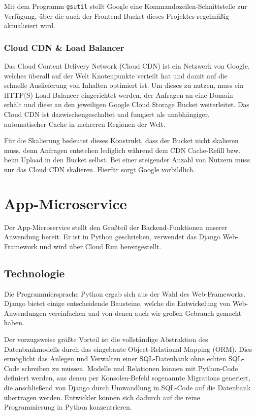 \documentclass{article}
\begin{document}
Mit dem Programm \texttt{gsutil} stellt Google eine Kommandozeilen-Schnittstelle zur Verfügung, über die auch der Frontend Bucket dieses Projektes regelmäßig aktualisiert wird.


\subsubsection{Cloud CDN \& Load Balancer}

Das Cloud Content Delivery Network (Cloud CDN) ist ein Netzwerk von Google, welches überall auf der Welt Knotenpunkte verteilt hat und damit auf die schnelle Auslieferung von Inhalten optimiert ist. Um dieses zu nutzen, muss ein HTTP(S) Load Balancer eingerichtet werden, der Anfragen an eine Domain erhält und diese an den jeweiligen Google Cloud Storage Bucket weiterleitet. Das Cloud CDN ist dazwischengeschaltet und fungiert als unabhängiger, automatischer Cache in mehreren Regionen der Welt.

Für die Skalierung bedeutet dieses Konstrukt, dass der Bucket nicht skalieren muss, denn Anfragen entstehen lediglich während dem CDN Cache-Refill bzw. beim Upload in den Bucket selbst. Bei einer steigender Anzahl von Nutzern muss nur das Cloud CDN skalieren. Hierfür sorgt Google vorbildlich.


\section{App-Microservice} %
\label{sec:app-microservice}

Der App-Microservice stellt den Großteil der Backend-Funktionen unserer Anwendung bereit. Er ist in Python geschrieben, verwendet das Django Web-Framework und wird über Cloud Run bereitgestellt.


\subsection{Technologie}
\label{sec:app-tech}

Die Programmiersprache Python ergab sich aus der Wahl des Web-Frameworks. Django bietet einige entscheidende Bausteine, welche die Entwickelung von Web-Anwendungen vereinfachen und von denen auch wir großen Gebrauch gemacht haben.

Der vorzugsweise größte Vorteil ist die vollständige Abstraktion des Datenbankmodells durch das eingebaute Object-Relational Mapping (ORM). Dies ermöglicht das Anlegen und Verwalten einer SQL-Datenbank ohne echten SQL-Code schreiben zu müssen. Modelle und Relationen können mit Python-Code definiert werden, aus denen per Konsolen-Befehl sogenannte Migrations generiert, die anschließend von Django durch Umwandlung in SQL-Code auf die Datenbank übertragen werden. Entwickler können sich dadurch auf die reine Programmierung in Python konzentrieren.
\end{document}

